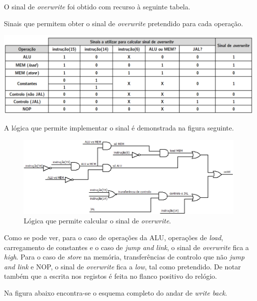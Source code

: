\documentclass[11pt]{article}
\numberwithin{equation}{section}
\begin{document}
O sinal de \textit{overwrite} foi obtido com recurso à seguinte tabela.

\vspace{1.5mm}
\begin{table}[h]
	\centering
	\caption{Sinais que permitem obter o sinal de \textit{overwrite} pretendido para cada operação.}
	\vspace{-2mm}
 	\includegraphics[keepaspectratio=true, scale=0.40]{tabelas/tabelaWE}
 	\label{tab:over}
\end{table}

A lógica que permite implementar o sinal é demonstrada na figura seguinte.

\begin{figure}[h]
	\centering
	\includegraphics[keepaspectratio=true, scale=0.5]{imagens/WB3}
	\caption{Lógica que permite calcular o sinal de \textit{overwrite}.}
	\vspace{-0.8em}
\end{figure}

Como se pode ver, para o caso de operações da ALU, operações de \textit{load}, carregamento de constantes e o caso de \textit{jump and link}, o sinal de \textit{overwrite} fica a \textit{high}. Para o caso de \textit{store} na memória, transferências de controlo que não \textit{jump and link} e NOP, o sinal de \textit{overwrite} fica a \textit{low}, tal como pretendido. De notar também que a escrita nos registos é feita no flanco positivo do relógio. 

Na figura abaixo encontra-se o esquema completo do andar de \textit{write back}.
\end{document}
